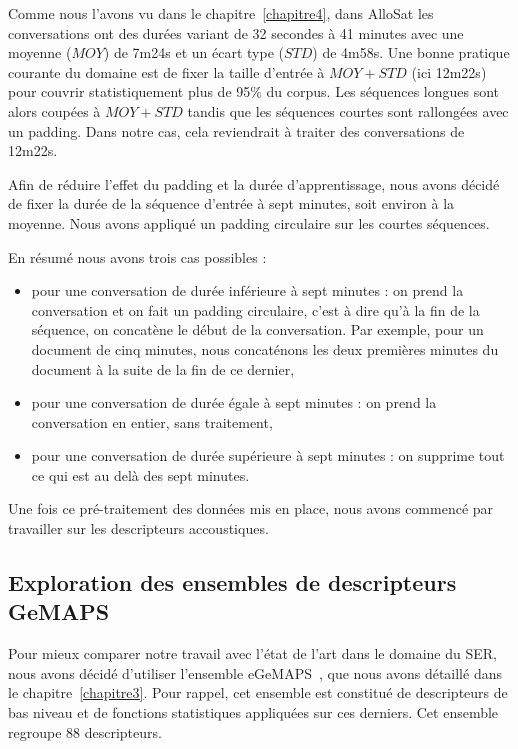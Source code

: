 Comme nous l'avons vu dans le chapitre~\ref{chapitre4}, dans AlloSat les conversations ont des durées variant de 32 secondes à 41 minutes avec une moyenne ($MOY$) de 7m24s et un écart type ($STD$) de 4m58s. Une bonne pratique courante du domaine est de fixer la taille d'entrée à $MOY + STD$ (ici 12m22s) pour couvrir statistiquement plus de 95\% du corpus. Les séquences longues sont alors coupées à $MOY + STD$ tandis que les séquences courtes sont rallongées avec un padding. Dans notre cas, cela reviendrait à traiter des conversations de 12m22s.

Afin de réduire l'effet du padding et la durée d'apprentissage, nous avons décidé de fixer la durée de la séquence d'entrée à sept minutes, soit environ à la moyenne. Nous avons appliqué un padding circulaire sur les courtes séquences.

En résumé nous avons trois cas possibles :
\begin{itemize}
  \item pour une conversation de durée inférieure à sept minutes : on prend la conversation et on fait un padding circulaire, c'est à dire qu'à la fin de la séquence, on concatène le début de la conversation. Par exemple, pour un document de cinq minutes, nous concaténons les deux premières minutes du document à la suite de la fin de ce dernier,
  \item pour une conversation de durée égale à sept minutes : on prend la conversation en entier, sans traitement,
  \item pour une conversation de durée supérieure à sept minutes : on supprime tout ce qui est au delà des sept minutes.
\end{itemize}

Une fois ce pré-traitement des données mis en place, nous avons commencé par travailler sur les descripteurs accoustiques.

\subsection{Exploration des ensembles de descripteurs GeMAPS}
Pour mieux comparer notre travail avec l'état de l'art dans le domaine du SER, nous avons décidé d'utiliser l'ensemble eGeMAPS~\cite{Eyben2016}, que nous avons détaillé dans le chapitre~\ref{chapitre3}. Pour rappel, cet ensemble est constitué de descripteurs de bas niveau et de fonctions statistiques appliquées sur ces derniers. Cet ensemble regroupe 88 descripteurs.

